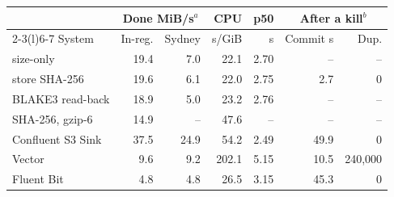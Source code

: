 
\begin{tabular}{@{}lrrrrrr@{}}
\toprule
& \multicolumn{2}{c}{Done MiB/s$^a$} & CPU & p50 & \multicolumn{2}{c}{After a kill$^b$} \\ \cmidrule(lr){2-3}\cmidrule(l){6-7}
System & In-reg. & Sydney & s/GiB & s & Commit s & Dup. \\
\midrule
\sysname{} size-only & 19.4 & 7.0 & 22.1 & 2.70 & -- & -- \\
\sysname{} store SHA-256 & 19.6 & 6.1 & 22.0 & 2.75 & 2.7 & 0 \\
\sysname{} BLAKE3 read-back & 18.9 & 5.0 & 23.2 & 2.76 & -- & -- \\
\sysname{} SHA-256, gzip-6 & 14.9 & -- & 47.6 & -- & -- & -- \\
\addlinespace[1pt]
Confluent S3 Sink & 37.5 & 24.9 & 54.2 & 2.49 & 49.9 & 0 \\
Vector & 9.6 & 9.2 & 202.1 & 5.15 & 10.5 & 240{,}000 \\
Fluent Bit & 4.8 & 4.8 & 26.5 & 3.15 & 45.3 & 0 \\
\bottomrule
\end{tabular}
